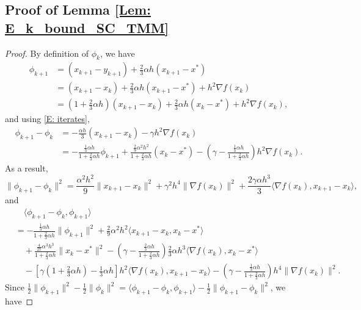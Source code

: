 \documentclass[pdflatex,sn-mathphys-num]{sn-jnl}
\theoremstyle{thmstyleone}
\theoremstyle{thmstyletwo}
\theoremstyle{thmstylethree}
\begin{document}
\begin{appendices}
\section{Proof of Lemma \ref{Lem: E_k_bound_SC_TMM}}
\label{Proof: Lem: E_k_bound_SC_TMM}

\begin{proof}
By definition of $\phi_k$, we have
\begin{align*}
\phi_{k+1} 
&= (x_{k+1}-y_{k+1}) + \frac{2}{3}\alpha h (x_{k+1}-x^*) \\
&= (x_{k+1}-x_k) + \frac{2}{3}\alpha h (x_{k+1}-x^*) + h^2 \nabla f(x_k)\\
&= \left( 1 + \frac{2}{3}\alpha h \right)(x_{k+1}-x_k)
  + \frac{2}{3}\alpha h (x_k-x^*) + h^2 \nabla f(x_k), 
\end{align*}
and using \eqref{E: iterates},
\begin{align*}
\phi_{k+1}-\phi_k
&= -\frac{\alpha h}{3} (x_{k+1}-x_k) - \gamma h^2 \nabla f(x_k) \\
&= -\frac{ \frac{1}{3}\alpha h }{ 1 + \frac{2}{3}\alpha h }\phi_{k+1}
   + \frac{\frac{2}{9}\alpha^2 h^2}{1+\frac{2}{3}\alpha h}(x_k-x^*)  
   - \left( \gamma - \frac{ \frac{1}{3}\alpha h }{ 1 + \frac{2}{3}\alpha h } \right) h^2 \nabla f(x_k).
\end{align*}
As a result,
$$ \| \phi_{k+1}-\phi_k \|^2
= \frac{\alpha^2 h^2}{9}\| x_{k+1}-x_k \|^2 
  + \gamma^2 h^4 \| \nabla f(x_k) \|^2 
  + \frac{2\gamma\alpha h^3}{3} \langle \nabla f(x_k), x_{k+1} - x_k \rangle, $$
and
\begin{align*}
&\quad \langle \phi_{k+1}-\phi_k, \phi_{k+1} \rangle \\
&= - \frac{ \frac{1}{3}\alpha h }{ 1 + \frac{2}{3}\alpha h }\| \phi_{k+1} \|^2 
   + \frac{2}{9}\alpha^2 h^2\langle x_{k+1}-x_k, x_k - x^* \rangle\\
&\quad + \frac{\frac{4}{27}\alpha^3 h^3}{1+\frac{2}{3}\alpha h}\| x_k - x^* \|^2 
   - \left( \gamma - \frac{\frac{2}{3}\alpha h}{1+\frac{2}{3}\alpha h} \right)\frac{2}{3}\alpha h^3\langle \nabla f(x_k), x_k-x^* \rangle \\
&\quad - \left[ \gamma \left( 1 + \frac{2}{3}\alpha h \right) - \frac{1}{3}\alpha h \right] h^2  \langle \nabla f(x_k),x_{k+1}-x_k \rangle 
 - \left( \gamma - \frac{ \frac{1}{3}\alpha h }{ 1 + \frac{2}{3}\alpha h } \right) h^4 \| \nabla f(x_k) \|^2.
\end{align*}
Since $\frac{1}{2}\| \phi_{k+1} \|^2 - \frac{1}{2}\| \phi_k \|^2 = \langle \phi_{k+1}-\phi_k, \phi_{k+1} \rangle - \frac{1}{2}\| \phi_{k+1} - \phi_k \|^2$, we have

\end{proof}
\end{appendices}
\end{document}
